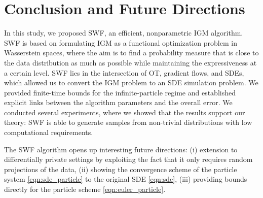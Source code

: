 
\section{Conclusion and Future Directions}

In this study, we proposed SWF, an efficient, nonparametric IGM algorithm.
SWF is based on formulating IGM as a functional optimization problem in Wasserstein spaces, where the aim is to find a probability measure that is close to the data distribution as much as possible while maintaining the expressiveness at a certain level.
SWF lies in the intersection of OT, gradient flows, and SDEs, which allowed us to convert the IGM problem to an SDE simulation problem. We provided finite-time bounds for the infinite-particle regime and established explicit links between the algorithm parameters and the overall error.
We conducted several experiments, where we showed that the results support our theory: SWF is able to generate samples from non-trivial distributions with low computational requirements.

The SWF algorithm opens up interesting future directions: (i) extension to differentially private settings \cite{dwork2014algorithmic} by exploiting the fact that it only requires random projections of the data, (ii) showing the convergence scheme of the particle system \eqref{eqn:sde_particle} to the original SDE \eqref{eqn:sde}, (iii) providing bounds directly for the particle scheme \eqref{eqn:euler_particle}.
